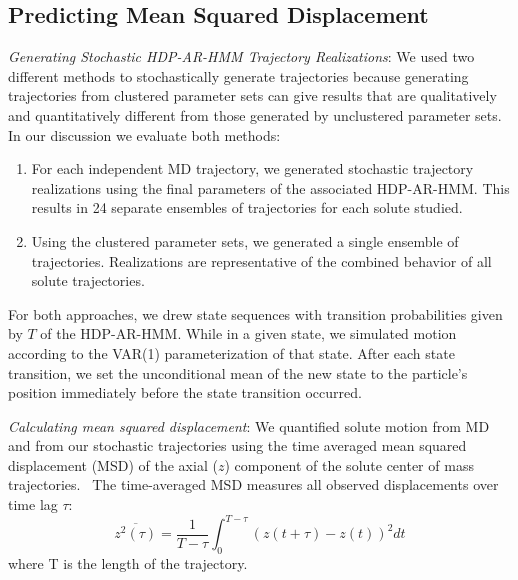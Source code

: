 \documentclass[journal=jpcbfk,manuscript=article]{achemso}
\begin{document}
  \subsection{Predicting Mean Squared Displacement}\label{method:realizations}
  \textit{Generating Stochastic HDP-AR-HMM Trajectory Realizations}: We used two 
  different methods to stochastically generate trajectories because generating
  trajectories from clustered parameter sets can give results that are qualitatively 
  and quantitatively different from those generated by unclustered parameter sets.
  In our discussion we evaluate both methods:
  \begin{enumerate}[label={Method \theenumi :}, leftmargin=3.5\parindent]
    \item For each independent MD trajectory, we generated stochastic trajectory
    realizations using the final parameters of the associated HDP-AR-HMM. This 
    results in 24 separate ensembles of trajectories for each solute studied. 
    \item Using the clustered parameter sets, we generated a single ensemble
	of trajectories. Realizations are representative of the combined behavior
	of all solute trajectories.
  \end{enumerate}
  
  For both approaches, we drew state sequences with transition probabilities given 
  by $T$ of the HDP-AR-HMM. While in a given state, we simulated motion according to the 
  VAR(1) parameterization of that state. After each state transition, we set the 
  unconditional mean of the new state to the particle's position immediately before
  the state transition occurred.
  
  \textit{Calculating mean squared displacement}: We quantified solute motion from
  MD and from our stochastic trajectories using the time averaged mean squared 
  displacement (MSD) of the axial ($z$) component of the solute center of mass
  trajectories.~\cite{meroz_toolbox_2015} The time-averaged MSD measures all observed 
  displacements over time lag $\tau$:
  \begin{equation}
  	\overline{z^2(\tau)} = \dfrac{1}{T - \tau}\int_{0}^{T - \tau} (z(t + \tau) - z(t))^2 dt
  \label{eqn:tamsd}
  \end{equation}
  where T is the length of the trajectory. 
  
\end{document}

